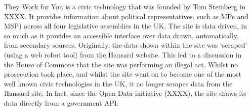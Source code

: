 They Work for You is a civic technology that was founded by Tom Steinberg in XXXX. It provides information about political representatives, such as MPs and MSP) across all four legislative assemblies in the UK. The site is data driven, in so much as it provides an accessible interface over data drawn, automatically, from secondary sources. Originally, the data shown within the site was ‘scraped’ (using a web robot tool) from the Hansard website. This led to  a discussion in the House of Commons that the site was performing an illegal act. Whilst no prosecution took place, and whilst the site went on to become one of the most well known civic technologies in the UK, it no longer scrapes data from the Hansard site. In fact, since the Open Data initiative (XXXX), the site draws its data directly from a government API.